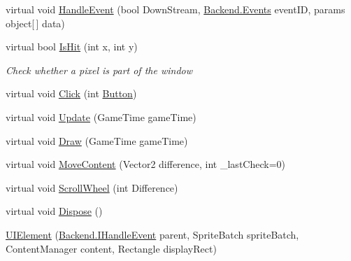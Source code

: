 \begin{DoxyCompactItemize}
\item 
virtual void \hyperlink{class_gruppe22_1_1_client_1_1_u_i_element_ad06a1ce6c1705a1c7aa91756f368a517}{Handle\-Event} (bool Down\-Stream, \hyperlink{namespace_gruppe22_1_1_backend_ab56df91bb0bdafa1ea978e552209ce73}{Backend.\-Events} event\-I\-D, params object\mbox{[}$\,$\mbox{]} data)
\item 
virtual bool \hyperlink{class_gruppe22_1_1_client_1_1_u_i_element_a3be972299c1d8b6f7518b833f5c98992}{Is\-Hit} (int x, int y)
\begin{DoxyCompactList}\small\item\em Check whether a pixel is part of the window \end{DoxyCompactList}\item 
virtual void \hyperlink{class_gruppe22_1_1_client_1_1_u_i_element_a05e0ac3dfb0da30700c0c8e3b52ff7d2}{Click} (int \hyperlink{class_gruppe22_1_1_client_1_1_button}{Button})
\item 
virtual void \hyperlink{class_gruppe22_1_1_client_1_1_u_i_element_a456bc763b6ed6ab441bb0ae96b6f4f8b}{Update} (Game\-Time game\-Time)
\item 
virtual void \hyperlink{class_gruppe22_1_1_client_1_1_u_i_element_ae68afcbd1db3540052d6b399022e56e7}{Draw} (Game\-Time game\-Time)
\item 
virtual void \hyperlink{class_gruppe22_1_1_client_1_1_u_i_element_aa089eaf82ae3a89724a45eb8860cb97b}{Move\-Content} (Vector2 difference, int \-\_\-last\-Check=0)
\item 
virtual void \hyperlink{class_gruppe22_1_1_client_1_1_u_i_element_a691954dde0b9a1d39c064e86fea19bf5}{Scroll\-Wheel} (int Difference)
\item 
virtual void \hyperlink{class_gruppe22_1_1_client_1_1_u_i_element_a4dbf6405c99a1b2b45610d90e127e7fd}{Dispose} ()
\item 
\hyperlink{class_gruppe22_1_1_client_1_1_u_i_element_ad195705bcc97b394fd8216e290147779}{U\-I\-Element} (\hyperlink{interface_gruppe22_1_1_backend_1_1_i_handle_event}{Backend.\-I\-Handle\-Event} parent, Sprite\-Batch sprite\-Batch, Content\-Manager content, Rectangle display\-Rect)
\end{DoxyCompactItemize}
